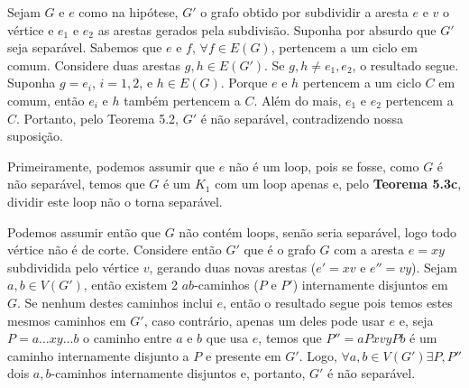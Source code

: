 
 Sejam $G$ e $e$ como na hipótese, $G'$ o grafo obtido por
subdividir a aresta $e$ e $v$ o vértice e $e_1$ e $e_2$ as arestas gerados pela
subdivisão.  Suponha por absurdo que $G'$ seja separável. Sabemos que $e$ e
$f$, $\forall f \in E(G)$, pertencem a um ciclo em comum. Considere duas
arestas $g, h \in E(G')$.  Se $g,h \ne e_1, e_2$, o resultado segue. Suponha $g
= e_i$, $i = 1, 2$, e $h \in E(G)$. Porque $e$ e $h$ pertencem a um ciclo $C$
em comum, então $e_i$ e $h$ também pertencem a $C$. Além do mais, $e_1$ e $e_2$
pertencem a $C$.  Portanto, pelo Teorema 5.2, $G'$ é não separável,
contradizendo nossa suposição.
\fimprova

 Primeiramente, podemos assumir que $e$ não é um loop, pois
se fosse, como $G$ é não separável, temos que $G$ é um $K_1$ com um loop apenas e,
pelo {\bf Teorema 5.3c}, dividir este loop não o torna separável.

Podemos assumir então que $G$ não contém loops, senão seria separável, logo todo
vértice não é de corte. Considere então $G'$ que é o grafo $G$ com a aresta 
$e = xy$ subdividida pelo vértice $v$, gerando duas novas arestas ($e'= xv$ e 
$e''= vy$). Sejam $a,b \in V(G')$, então existem 2 $ab$-caminhos ($P$ e $P'$)
internamente disjuntos em $G$. Se nenhum destes caminhos inclui $e$, então o 
resultado segue pois temos estes mesmos caminhos em $G'$, caso contrário, apenas
um deles pode usar $e$ e, seja $P = a\ldots xy \ldots b$ o caminho entre $a$ e
$b$ que usa $e$, temos que $P'' = aPxvyPb$ é um caminho internamente disjunto a
$P$ e presente em $G'$. Logo, $\forall a,b \in V(G') \exists P,P''$ dois 
$a,b$-caminhos internamente disjuntos e, portanto, $G'$ é não separável. 
\fimprova
